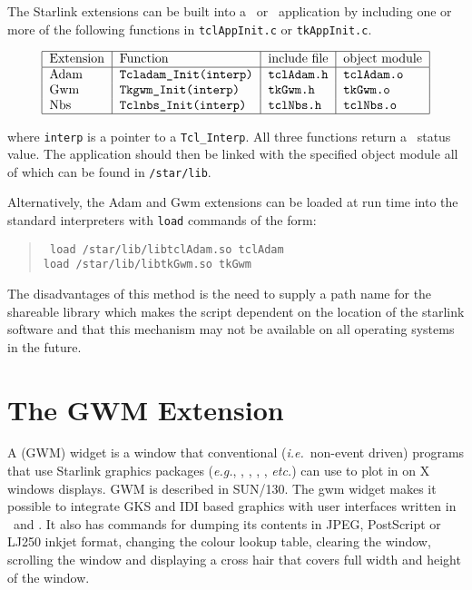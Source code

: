 The Starlink extensions can be built into a \Tcl\ or \Tk\ application
by including one or more of the following functions in
{\tt{tclAppInit.c}} or {\tt{tkAppInit.c}}.

\[\begin{tabular}{|l|l|l|l|}
\hline
Extension &Function &include file &object module\\
\hline
Adam &\tt Tcladam\_Init(interp) &\tt tclAdam.h &\tt tclAdam.o\\
Gwm &\tt Tkgwm\_Init(interp) &\tt tkGwm.h &\tt tkGwm.o\\
Nbs &\tt Tclnbs\_Init(interp) &\tt tclNbs.h &\tt tclNbs.o\\
\hline
\end{tabular}\]

where {\tt{interp}} is a pointer to a {\tt{Tcl\_Interp}}. All three functions
return a \Tcl\ status value. The application should then be linked with the
specified object module all of which can be found in {\tt{/star/lib}}.

Alternatively, 
the Adam and Gwm extensions can be loaded at run time into
the standard interpreters with {\tt{load}} commands of the form:
\begin{quote}{\tt
load /star/lib/libtclAdam.so tclAdam\\
load /star/lib/libtkGwm.so tkGwm
}\end{quote}

The disadvantages of this method is the need to supply a path name for
the shareable library which makes the script dependent on the location
of the starlink software and that this mechanism may not be available
on all operating systems in the future.

\section{\label{gwm_extension}The GWM Extension}

A  (GWM) widget is a window that 
conventional ({\em{i.e.}}\ non-event driven) programs that use
Starlink graphics packages ({\em{e.g.}}, 
, 
, 
, 
, 
 {\em{etc.}}) can use
to plot in on X windows displays. GWM is described in SUN/130. The gwm widget
makes it possible to integrate GKS and IDI based graphics with user interfaces
written in \Tcl\ and \Tk.  It also has commands for dumping its contents 
in JPEG, PostScript or LJ250 inkjet format, changing the colour lookup table,
clearing the window, scrolling the window  and displaying a cross hair
that covers full width and height of the window.

